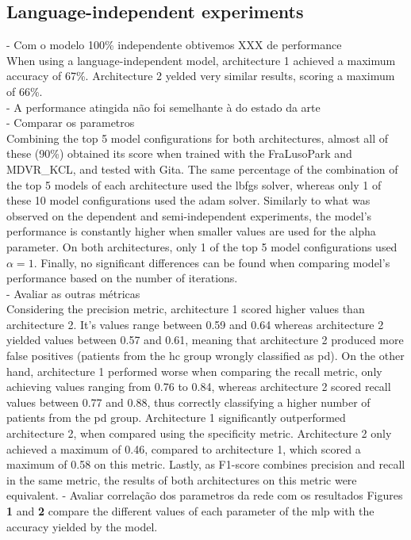 \subsection{Language-independent experiments}
 - Com o modelo 100\% independente obtivemos XXX de performance \\
When using a language-independent model, architecture 1 achieved a maximum accuracy of 67\%. Architecture 2 yelded very similar results, scoring a maximum of 66\%. \\
 - A performance atingida não foi semelhante à do estado da arte \\
 - Comparar os parametros \\
 Combining the top 5 model configurations for both architectures, almost all of these (90\%) obtained its score when trained with the FraLusoPark and MDVR\_KCL, and tested with Gita. The same percentage of the combination of the top 5 models of each architecture used the lbfgs solver, whereas only 1 of these 10 model configurations used the adam solver. Similarly to what was observed on the dependent and semi-independent experiments, the model's performance is constantly higher when smaller values are used for the alpha parameter. On both architectures, only 1 of the top 5 model configurations used $\alpha = 1$. Finally, no significant differences can be found when comparing model's performance based on the number of iterations. \\
 - Avaliar as outras métricas \\
Considering the precision metric, architecture 1 scored higher values than architecture 2. It's values range between 0.59 and 0.64 whereas architecture 2 yielded values between 0.57 and 0.61, meaning that architecture 2 produced more false positives (patients from the \gls{hc} group wrongly classified as \gls{pd}). On the other hand, architecture 1 performed worse when comparing the recall metric, only achieving values ranging from 0.76 to 0.84, whereas architecture 2 scored recall values between 0.77 and 0.88, thus correctly classifying a higher number of patients from the \gls{pd} group. Architecture 1 significantly outperformed architecture 2, when compared using the specificity metric. Architecture 2 only achieved a maximum of 0.46, compared to architecture 1, which scored a maximum of 0.58 on this metric. Lastly, as F1-score combines precision and recall in the same metric, the results of both architectures on this metric were equivalent.
- Avaliar correlação dos parametros da rede com os resultados
Figures \textbf{1} and \textbf{2} compare the different values of each parameter of the \gls{mlp} with the accuracy yielded by the model.

